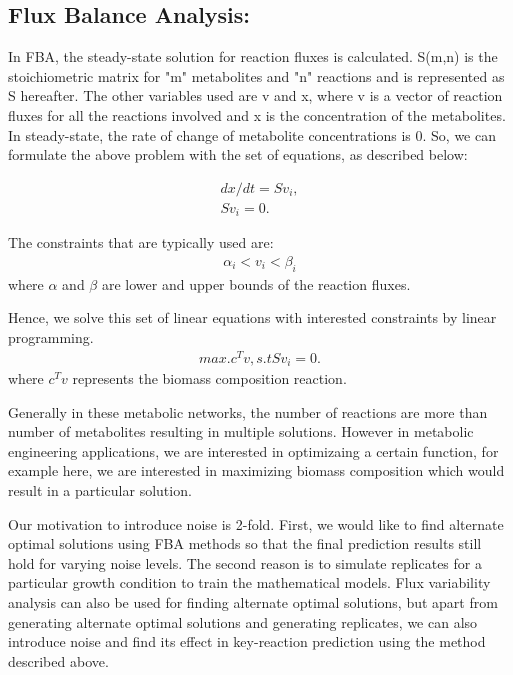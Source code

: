 \documentclass[12pt]{article}
\begin{document}
\subsection*{Flux Balance Analysis:} 
In FBA, the steady-state solution for reaction fluxes is calculated. S(m,n) is the stoichiometric matrix for "m" metabolites and "n" reactions and is represented as S hereafter. The other variables used are v and x, where v is a vector of reaction fluxes for all the reactions involved and x is the concentration of the metabolites. In steady-state, the rate of change of metabolite concentrations is 0. So, we can formulate the above problem with the set of equations, as described below:

\begin{align}
dx/dt = Sv_{i}, \\
Sv_{i}=0.
\end{align}

The constraints that are typically used are: 
\begin{align}
\alpha_{i}<v_{i}<\beta_{i}
\end{align}
where $\alpha$ and $\beta$ are lower and upper bounds of the reaction fluxes.

Hence, we solve this set of linear equations with interested constraints by linear programming.
\begin{align}
{max.} c^Tv, s. t Sv_{i}=0.
\end{align}
where $c^Tv$ represents the biomass composition reaction.

Generally in these metabolic networks, the number of reactions are more than number of metabolites resulting in multiple solutions.  However in metabolic engineering applications, we are interested in optimizaing a certain function, for example here, we are interested in maximizing biomass composition which would result in a particular solution. 

Our motivation to introduce noise is 2-fold. First, we would like to find alternate optimal solutions using FBA methods so that the final prediction results still hold for varying noise levels. The second reason is to simulate replicates for a particular growth condition to train the mathematical models. Flux variability analysis can also be used for finding alternate optimal solutions, but apart from generating alternate optimal solutions and generating replicates, we can also introduce noise and find its effect in key-reaction prediction using the method described above.
\end{document}
